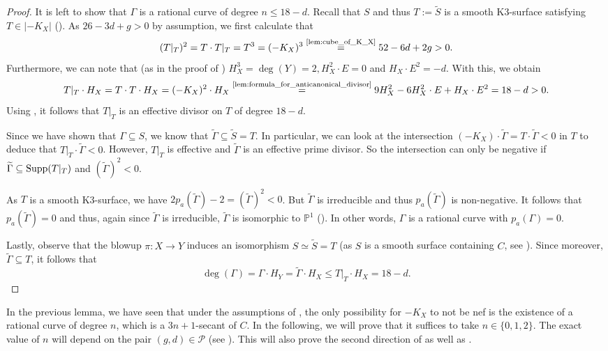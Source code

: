 \documentclass[english,11pt,reqno]{amsart}
\newcommand{\sub}{\subseteq}
\newcommand{\Pone}{\mathbb{P}^1}
\newcommand{\supp}{\textup{Supp}}
\begin{document}
\begin{proof}
It is left to show that $\Gamma$ is a rational curve of degree $n\leq 18-d$. Recall that $S$ and thus
$T:=\widetilde{S}$ is a smooth K3-surface satisfying $T\in |-K_X|$ (). As $26-3d+g>0$ by assumption, we first calculate that
$$(T|_T)^2= T\cdot T|_T = T^3= (-K_X)^3\overset{\textup{\ref{lem:cube_of_K_X}}}{=}52-6d+2g >0.$$
Furthermore, we can note that (as in the proof of ) $H_X^3=\deg(Y)=2, H_X^2\cdot E = 0$ and $H_X\cdot E^2 =-d$. With this, we obtain
$$ T|_T \cdot H_X = T\cdot T \cdot H_X = (-K_X)^2\cdot H_X \overset{\textup{\ref{lem:formula_for_anticanonical_divisor}}}{=}9H_X^2-6H_X^2\cdot E+ H_X\cdot E^2=18-d> 0.$$ 
Using , it follows that $T|_T$ is an effective  divisor on $T$ of degree $18-d$. \par 
Since we have shown that $\Gamma \sub S$, we know that $\widetilde{\Gamma} \sub \widetilde{S}=T$. In particular, we can look at the intersection $(-K_X)\cdot \widetilde{\Gamma} = T\cdot \widetilde{\Gamma}<0$ in $T$ to deduce that $T|_T\cdot \widetilde{\Gamma}<0$. However, $T|_T$ is effective and $\widetilde{\Gamma}$ is an effective prime divisor. So the intersection can only be negative if $\widetilde{\Gamma}\sub \supp(T|_T)$ and $(\widetilde{\Gamma})^2<0$. \par
As $T$ is a smooth K3-surface, we have $2p_a(\widetilde{\Gamma})-2=(\widetilde{\Gamma})^2<0$. But $\widetilde{\Gamma}$ is irreducible and thus $p_a(\widetilde{\Gamma})$ is non-negative. It follows that $p_a(\widetilde{\Gamma})=0$ and thus, again since $\widetilde{\Gamma}$ is irreducible, $\widetilde{\Gamma}$ is isomorphic to $\Pone$ (\cite[Cor.\ 7.7]{Mumford-Algebraic_Geometry_I}). In other words, $\Gamma$ is a rational curve with $p_a(\Gamma)=0$.\par
Lastly, observe that the blowup $\pi:X\rightarrow Y$ induces an isomorphism $S\simeq \widetilde{S}=T$ (as $S$ is a smooth surface containing $C$, see ). Since moreover, $\widetilde{\Gamma}\sub T$, it follows that 
$$ \deg(\Gamma)= \Gamma \cdot H_Y= \widetilde{\Gamma} \cdot H_X \leq T|_T \cdot H_X =18-d.$$ 
\end{proof}
%
In the previous lemma, we have seen that under the assumptions of , the only possibility for $-K_X$ to not be nef is the existence of a rational curve of degree $n$, which is a $3n+1$-secant of $C$. In the following, we will prove  that it suffices to take $n\in \{0,1,2\}$. The exact value of $n$ will depend on the pair $(g,d)\in \mathcal{P}$ (see ). This will also prove the second direction of  as well as .
\end{document}
